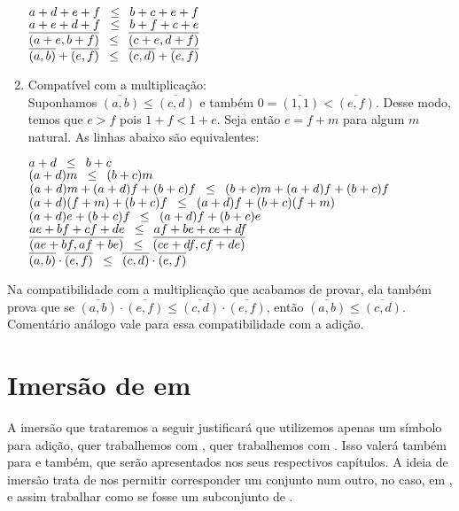 \documentclass[../main.tex]{subfiles}
\begin{document}
\begin{dem}
\begin{enumerate}[label=(\roman*)]
\begin{center}
            $a + d +e+f \hspace{8pt} {\leq} \hspace{8pt} b + c + e+f$ \\
            $a + e + d +f \hspace{8pt} {\leq} \hspace{8pt} b + f + c + e$ \\
            $\overline{(a+e,b+f)} \hspace{8pt} {\leq} \hspace{8pt} \overline{(c+e, d+f)}$ \\
            $\overline{(a,b)} + \overline{(e,f)} \hspace{8pt} {\leq} \hspace{8pt} \overline{(c,d)} + \overline{(e,f)}$

        \end{center}

        
        \item Compatível com a multiplicação: \\
        Suponhamos $\overline{(a,b)} \leq \overline{(c,d)}$ e também $0 = \overline{(1,1)} < \overline{(e,f)}$.
        Desse modo, temos que $e > f$ pois $1+f < 1+e$. Seja então $e = f+m$ para algum $m$ natural. As linhas abaixo são equivalentes:
        \begin{center}
            $a+d \hspace{8pt} {\leq} \hspace{8pt} b+c  $\\
            $(a+d)m \hspace{8pt} {\leq} \hspace{8pt} (b+c)m $ \\
            $(a+d)m + (a+d)f + (b+c)f \hspace{8pt} {\leq} \hspace{8pt} (b+c)m + (a+d)f + (b+c)f$ \\
            $(a+d)(f+m) + (b+c)f \hspace{8pt} {\leq} \hspace{8pt} (a+d)f + (b+c)(f+m)$ \\
            $(a+d)e + (b+c)f \hspace{8pt} {\leq} \hspace{8pt} (a+d)f + (b+c)e$ \\
            $ae+bf + cf+de \hspace{8pt} {\leq} \hspace{8pt} af+be + ce+df  $\\
            $\overline{(ae+bf, af+be)} \hspace{8pt} {\leq} \hspace{8pt} \overline{(ce+df, cf+de)}  $ \\           
            $\overline{(a,b)} \cdot \overline{(e,f)} \hspace{8pt} {\leq} \hspace{8pt} \overline{(c,d)} \cdot \overline{(e,f)} $ 
        \end{center}        
        
    \end{enumerate}
\end{dem}
\begin{obs}
    Na compatibilidade com a multiplicação que acabamos de provar, ela também prova que se $\overline{(a,b)} \cdot \overline{(e,f)} 
    \leq \overline{(c,d)} \cdot \overline{(e,f)}$, então $\overline{(a,b)} \leq \overline{(c,d)}$. Comentário análogo vale para essa compatibilidade com a adição.
\end{obs}



\section{Imersão de \N em \Z}
A imersão que trataremos a seguir justificará que utilizemos apenas um símbolo para adição, quer trabalhemos com \N, quer trabalhemos com \Z. Isso valerá também para \Q e \R também, que serão apresentados nos seus respectivos capítulos. A ideia de imersão trata de nos permitir corresponder um conjunto num outro, no caso, \N em \Z, e assim trabalhar como se \N fosse um subconjunto de \Z.
\end{document}
